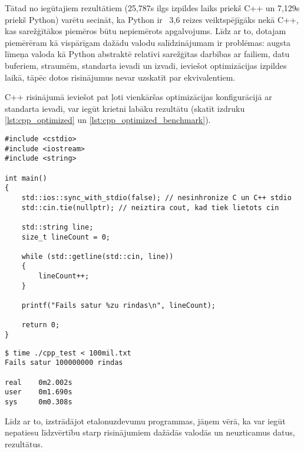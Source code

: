 Tātad no iegūtajiem rezultātiem (25,787s ilgs izpildes laiks priekš C++ un
7,129s priekš Python) varētu secināt, ka Python ir ~3,6 reizes veiktspējīgāks
nekā C++, kas sarežģītākos piemēros būtu nepiemērots apgalvojums. Līdz ar to,
dotajam piemērēram kā vispārīgam dažādu valodu salīdzinājumam ir problēmas:
augsta līmeņa valoda kā Python abstraktē relatīvi sarežģītas darbības ar
failiem, datu buferiem, straumēm, standarta ievadi un izvadi, ieviešot
optimizācijas izpildes laikā, tāpēc dotos risinājumus nevar uzskatīt par
ekvivalentiem.

C++ risinājumā ieviešot pat ļoti vienkāršas optimizācijas konfigurācijā ar
standarta ievadi, var iegūt krietni labāku rezultātu (skatīt izdruku
\ref{lst:cpp_optimized} un \ref{lst:cpp_optimized_benchmark}).

\begin{lstlisting}[caption={Optimizēta vienkārša faila apstrāde valodā C++ caur standarta ievadi },
  label=lst:cpp_optimized,
  captionpos=b
]
#include <cstdio>
#include <iostream>
#include <string>

int main()
{
    std::ios::sync_with_stdio(false); // nesinhronize C un C++ stdio 
    std::cin.tie(nullptr); // neiztira cout, kad tiek lietots cin

    std::string line;
    size_t lineCount = 0;

    while (std::getline(std::cin, line))
    {
        lineCount++;
    }

    printf("Fails satur %zu rindas\n", lineCount);

    return 0;
}
\end{lstlisting}


\begin{lstlisting}[caption={Optimizētā C++ etalonuzdevuma rezultāti failam ar 100 miljoniem rindu},
  label=lst:cpp_optimized_benchmark,
  captionpos=b
]
$ time ./cpp_test < 100mil.txt 
Fails satur 100000000 rindas 

real    0m2.002s
user    0m1.690s
sys     0m0.308s
\end{lstlisting}

Līdz ar to, izstrādājot etalonuzdevumu programmas, jāņem vērā, ka var iegūt
nepatiesu līdzvērtību starp risinājumiem dažādās valodās un neuzticamus datus,
rezultātus.


